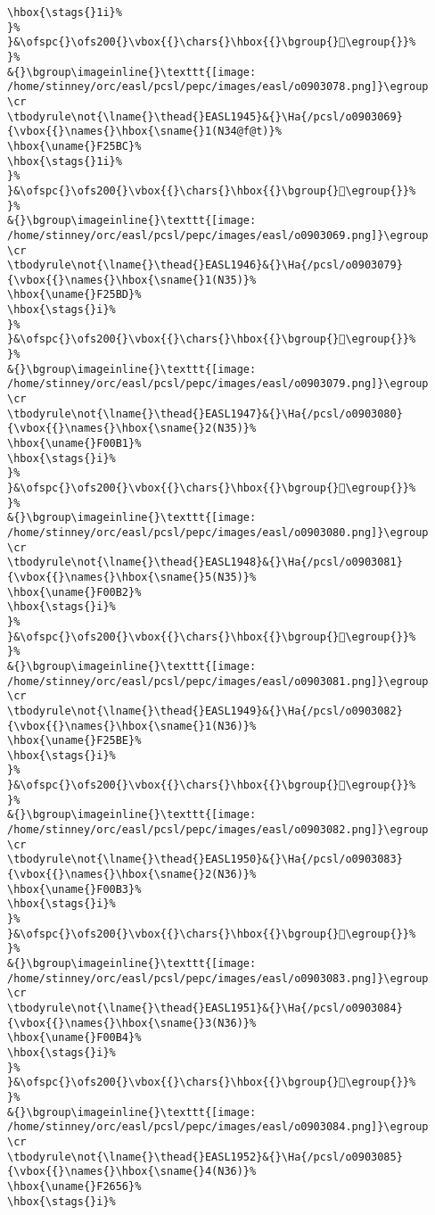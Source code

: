\begin{verbatim}
\hbox{\stags{}1i}%
}%
}&\ofspc{}\ofs200{}\vbox{{}\chars{}\hbox{{}\bgroup{}󰂰\egroup{}}%
}%
&{}\bgroup\imageinline{}\texttt{[image: /home/stinney/orc/easl/pcsl/pepc/images/easl/o0903078.png]}\egroup
\cr
\tbodyrule\not{\lname{}\thead{}EASL1945}&{}\Ha{/pcsl/o0903069}{\vbox{{}\names{}\hbox{\sname{}1(N34@f@t)}%
\hbox{\uname{}F25BC}%
\hbox{\stags{}1i}%
}%
}&\ofspc{}\ofs200{}\vbox{{}\chars{}\hbox{{}\bgroup{}󲖼\egroup{}}%
}%
&{}\bgroup\imageinline{}\texttt{[image: /home/stinney/orc/easl/pcsl/pepc/images/easl/o0903069.png]}\egroup
\cr
\tbodyrule\not{\lname{}\thead{}EASL1946}&{}\Ha{/pcsl/o0903079}{\vbox{{}\names{}\hbox{\sname{}1(N35)}%
\hbox{\uname{}F25BD}%
\hbox{\stags{}i}%
}%
}&\ofspc{}\ofs200{}\vbox{{}\chars{}\hbox{{}\bgroup{}󲖽\egroup{}}%
}%
&{}\bgroup\imageinline{}\texttt{[image: /home/stinney/orc/easl/pcsl/pepc/images/easl/o0903079.png]}\egroup
\cr
\tbodyrule\not{\lname{}\thead{}EASL1947}&{}\Ha{/pcsl/o0903080}{\vbox{{}\names{}\hbox{\sname{}2(N35)}%
\hbox{\uname{}F00B1}%
\hbox{\stags{}i}%
}%
}&\ofspc{}\ofs200{}\vbox{{}\chars{}\hbox{{}\bgroup{}󰂱\egroup{}}%
}%
&{}\bgroup\imageinline{}\texttt{[image: /home/stinney/orc/easl/pcsl/pepc/images/easl/o0903080.png]}\egroup
\cr
\tbodyrule\not{\lname{}\thead{}EASL1948}&{}\Ha{/pcsl/o0903081}{\vbox{{}\names{}\hbox{\sname{}5(N35)}%
\hbox{\uname{}F00B2}%
\hbox{\stags{}i}%
}%
}&\ofspc{}\ofs200{}\vbox{{}\chars{}\hbox{{}\bgroup{}󰂲\egroup{}}%
}%
&{}\bgroup\imageinline{}\texttt{[image: /home/stinney/orc/easl/pcsl/pepc/images/easl/o0903081.png]}\egroup
\cr
\tbodyrule\not{\lname{}\thead{}EASL1949}&{}\Ha{/pcsl/o0903082}{\vbox{{}\names{}\hbox{\sname{}1(N36)}%
\hbox{\uname{}F25BE}%
\hbox{\stags{}i}%
}%
}&\ofspc{}\ofs200{}\vbox{{}\chars{}\hbox{{}\bgroup{}󲖾\egroup{}}%
}%
&{}\bgroup\imageinline{}\texttt{[image: /home/stinney/orc/easl/pcsl/pepc/images/easl/o0903082.png]}\egroup
\cr
\tbodyrule\not{\lname{}\thead{}EASL1950}&{}\Ha{/pcsl/o0903083}{\vbox{{}\names{}\hbox{\sname{}2(N36)}%
\hbox{\uname{}F00B3}%
\hbox{\stags{}i}%
}%
}&\ofspc{}\ofs200{}\vbox{{}\chars{}\hbox{{}\bgroup{}󰂳\egroup{}}%
}%
&{}\bgroup\imageinline{}\texttt{[image: /home/stinney/orc/easl/pcsl/pepc/images/easl/o0903083.png]}\egroup
\cr
\tbodyrule\not{\lname{}\thead{}EASL1951}&{}\Ha{/pcsl/o0903084}{\vbox{{}\names{}\hbox{\sname{}3(N36)}%
\hbox{\uname{}F00B4}%
\hbox{\stags{}i}%
}%
}&\ofspc{}\ofs200{}\vbox{{}\chars{}\hbox{{}\bgroup{}󰂴\egroup{}}%
}%
&{}\bgroup\imageinline{}\texttt{[image: /home/stinney/orc/easl/pcsl/pepc/images/easl/o0903084.png]}\egroup
\cr
\tbodyrule\not{\lname{}\thead{}EASL1952}&{}\Ha{/pcsl/o0903085}{\vbox{{}\names{}\hbox{\sname{}4(N36)}%
\hbox{\uname{}F2656}%
\hbox{\stags{}i}%

\end{verbatim}

